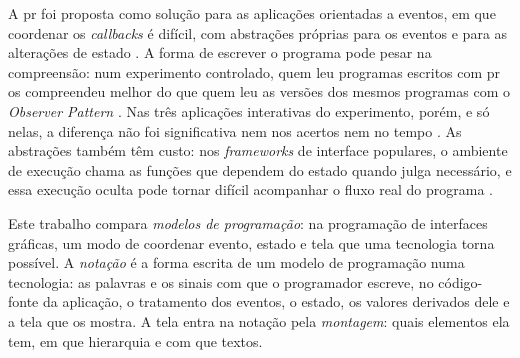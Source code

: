A \gls{pr} foi proposta como solução para as aplicações orientadas a
eventos, em que coordenar os \emph{callbacks} é difícil, com abstrações próprias
para os eventos e para as alterações de estado
\cite[p. 52:2]{bainomugisha2013}.
A forma de escrever o programa pode pesar na compreensão: num experimento
controlado, quem leu programas escritos
com \gls{pr} os compreendeu melhor do que quem leu as versões dos mesmos
programas com o \emph{Observer Pattern} \cite[p. 1125-1134]{salvaneschi2017}.
Nas três aplicações interativas do experimento, porém, e só nelas, a
diferença não foi significativa nem nos acertos nem no tempo
\cite[p. 1128 e 1133]{salvaneschi2017}.
As abstrações também têm custo: nos \emph{frameworks} de interface
populares, o ambiente de execução chama as funções que dependem do estado
quando julga necessário, e essa execução oculta pode tornar difícil
acompanhar o fluxo real do programa \cite[p. 13-14]{grolaux2026}.

Este trabalho compara \emph{modelos de programação}: na programação de
interfaces gráficas, um modo de coordenar evento, estado e tela que uma
tecnologia torna possível.
A \emph{notação} é a forma escrita de um modelo de programação numa
tecnologia: as palavras e os sinais com que o programador escreve, no
código-fonte da aplicação, o tratamento dos eventos, o estado, os valores
derivados dele e a tela que os mostra.
A tela entra na notação pela \emph{montagem}: quais elementos ela tem, em que
hierarquia e com que textos.

